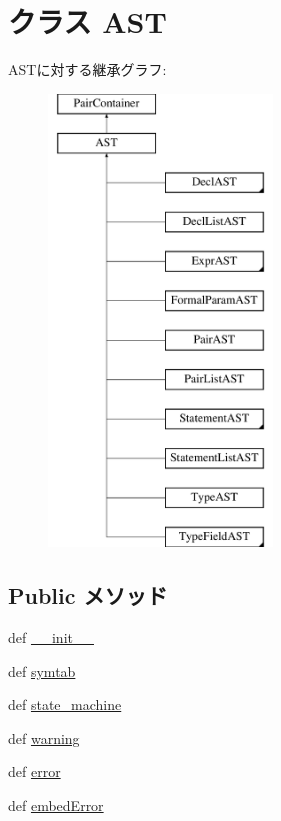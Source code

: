 \hypertarget{classslicc_1_1ast_1_1AST_1_1AST}{
\section{クラス AST}
\label{classslicc_1_1ast_1_1AST_1_1AST}
}
ASTに対する継承グラフ:\begin{figure}[H]
\begin{center}
\leavevmode
\includegraphics[height=12cm]{classslicc_1_1ast_1_1AST_1_1AST}
\end{center}
\end{figure}
\subsection*{Public メソッド}
\begin{DoxyCompactItemize}
\item 
def \hyperlink{classslicc_1_1ast_1_1AST_1_1AST_ac775ee34451fdfa742b318538164070e}{\_\-\_\-init\_\-\_\-}
\item 
def \hyperlink{classslicc_1_1ast_1_1AST_1_1AST_a2e24520edc67d58047aa1afbee945477}{symtab}
\item 
def \hyperlink{classslicc_1_1ast_1_1AST_1_1AST_ac4db0fc2cd33768643738f7f9d8bec5e}{state\_\-machine}
\item 
def \hyperlink{classslicc_1_1ast_1_1AST_1_1AST_ac1fc7cd7c75bbbeb7fcd0ada8bf86b81}{warning}
\item 
def \hyperlink{classslicc_1_1ast_1_1AST_1_1AST_a3133d4a0dde10b6ebe257e3db716a3e0}{error}
\item 
def \hyperlink{classslicc_1_1ast_1_1AST_1_1AST_ad3142f583b5f49478c9e2f319e9f7267}{embedError}
\end{DoxyCompactItemize}
